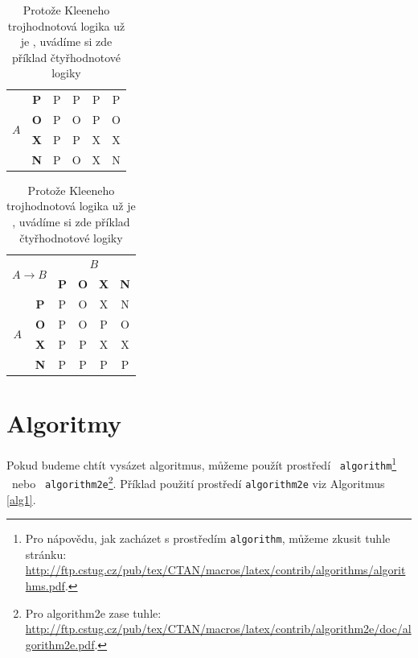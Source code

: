 \documentclass[a4paper,11pt]{article}
\begin{document}
\begin{table}[h]
\begin{tabular}{|c|c|c|c|c|c|}
        \hline
        \multirow{4}{*}{$A$} & \textbf{P} & P & P & P & P \\
        \cline{2-6}
         & \textbf{O} & P & O & P & O \\
        \cline{2-6}
         & \textbf{X} & P & P & X & X \\
        \cline{2-6}
         & \textbf{N} & P & O & X & N \\
        \hline
    \end{tabular}
    \begin{tabular}{|c|c|c|c|c|c|}
    \hline
        \multicolumn{2}{|c|}{\multirow{2}{*}{$A \rightarrow B$}} & \multicolumn{4}{c|}{$B$} \\
        \cline{3-6}
        \multicolumn{2}{|c|}{} & \textbf{P} & \textbf{O} & \textbf{X} & \textbf{N} \\
        \hline
        \multirow{4}{*}{$A$} & \textbf{P} & P & O & X & N \\
        \cline{2-6}
         & \textbf{O} & P & O & P & O \\
        \cline{2-6}
         & \textbf{X} & P & P & X & X \\
        \cline{2-6}
         & \textbf{N} & P & P & P & P \\
        \hline
    \end{tabular}
    \caption{Protože Kleeneho trojhodnotová logika už je , uvádíme si zde příklad čtyřhodnotové logiky}
    \label{tab2}
\end{table}
\newpage

\section{Algoritmy} \label{algoritmy}
Pokud budeme chtít vysázet algoritmus, můžeme použít prostředí \texttt{ algorithm}\footnote{Pro 	nápovědu, jak zacházet s prostředím \texttt{algorithm}, můžeme zkusit tuhle stránku: \\ \url{http://ftp.cstug.cz/pub/tex/CTAN/macros/latex/contrib/algorithms/algorithms.pdf}.} \ nebo \texttt{ algorithm2e}\footnote{Pro algorithm2e zase tuhle: \url{http://ftp.cstug.cz/pub/tex/CTAN/macros/latex/contrib/algorithm2e/doc/algorithm2e.pdf}.}. Příklad použití prostředí \texttt{algorithm2e} viz Algoritmus \ref{alg1}.
\end{document}
